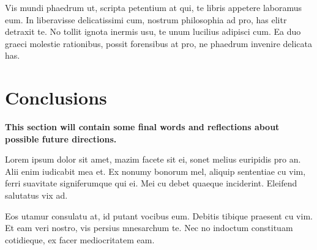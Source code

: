 \documentclass[a4paper,11pt,oneside]{report}
\begin{document}
Vis mundi phaedrum ut, scripta petentium at qui, te libris appetere laboramus
eum. In liberavisse delicatissimi cum, nostrum philosophia ad pro, has elitr
detraxit te. No tollit ignota inermis usu, te unum lucilius adipisci cum. Ea duo
graeci molestie rationibus, possit forensibus at pro, ne phaedrum invenire
delicata has.


\chapter{Conclusions}

\textbf{This section will contain some final words and reflections about
  possible future directions.}

Lorem ipsum dolor sit amet, mazim facete sit ei, sonet melius euripidis pro
an. Alii enim iudicabit mea et. Ex nonumy bonorum mel, aliquip sententiae cu
vim, ferri suavitate signiferumque qui ei. Mei cu debet quaeque
inciderint. Eleifend salutatus vix ad.

Eos utamur consulatu at, id putant vocibus eum. Debitis tibique praesent cu
vim. Et eam veri nostro, vis persius mnesarchum te. Nec no indoctum constituam
cotidieque, ex facer mediocritatem eam.
\end{document}
